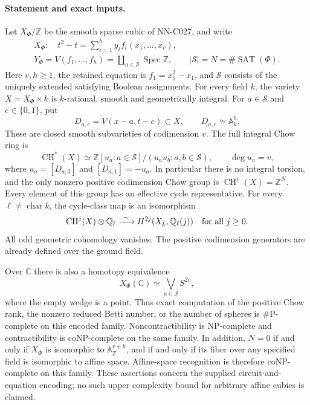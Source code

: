 \paragraph{Statement and exact inputs.}
Let $X_\Phi/\mathbb Z$ be the smooth sparse cubic of NN-C027, and write
\begin{gather*}
 X_\Phi:\quad t^2-t=\sum_{i=1}^h y_i f_i(x_1,\ldots,x_v),\\
 Y_\Phi=V(f_1,\ldots,f_h)=\coprod_{a\in\mathcal S}\operatorname{Spec}\mathbb Z,
 \qquad |\mathcal S|=N=\#\operatorname{SAT}(\Phi).
\end{gather*}
Here $v,h\ge1$, the retained equation is $f_1=x_1^2-x_1$, and
$\mathcal S$ consists of the uniquely extended satisfying Boolean assignments.
For every field $k$, the variety $X=X_\Phi\times k$ is $k$-rational,
smooth and geometrically integral. For $a\in\mathcal S$ and $e\in\{0,1\}$,
put
\[
 D_{a,e}=V(x-a,t-e)\subset X,\qquad D_{a,e}\simeq\mathbb A^h_k.
\]
These are closed smooth subvarieties of codimension $v$. The full integral
Chow ring is
\begin{equation}\label{eq:S016-chow}
 \operatorname{CH}^*(X)\simeq
 \mathbb Z[u_a:a\in\mathcal S]/(u_a u_b:a,b\in\mathcal S),
 \qquad \deg u_a=v,
\end{equation}
where $u_a=[D_{a,0}]$ and $[D_{a,1}]=-u_a$.
In particular there is no integral torsion, and the only nonzero positive
codimension Chow group is $\operatorname{CH}^v(X)=\mathbb Z^N$.
Every element of this group has an effective cycle representative.
For every $\ell\ne\operatorname{char}k$, the cycle-class map is an isomorphism
\begin{equation}\label{eq:S016-cycle}
 \operatorname{CH}^j(X)\otimes\mathbb Q_\ell
       \xrightarrow{\ \sim\ }
 H^{2j}(X_{\bar k},\mathbb Q_\ell(j))
 \quad\hbox{for all }j\ge0.
\end{equation}
All odd geometric cohomology vanishes. The positive codimension generators
are already defined over the ground field.

Over $\mathbb C$ there is also a homotopy equivalence
\begin{equation}\label{eq:S016-wedge}
                  X_\Phi(\mathbb C)\simeq\bigvee_{a\in\mathcal S}S^{2v},
\end{equation}
where the empty wedge is a point. Thus exact computation of the positive
Chow rank, the nonzero reduced Betti number, or the number of spheres is
\#P-complete on this encoded family. Noncontractibility is NP-complete and
contractibility is coNP-complete on the same family. In addition, $N=0$ if and only if $X_\Phi$ is isomorphic to
$\mathbb A^{v+h}_{\mathbb Z}$, and if and only if its fiber over any
specified field is isomorphic to affine space. Affine-space recognition
is therefore coNP-complete on this family. These assertions concern
the supplied circuit-and-equation encoding; no such upper complexity bound
for arbitrary affine cubics is claimed.

